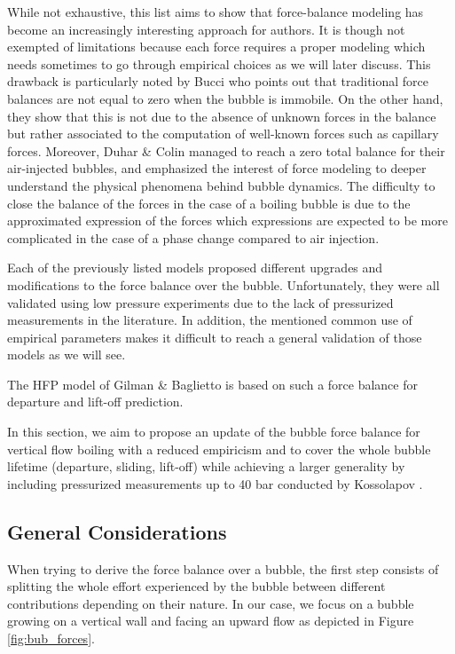 While not exhaustive, this list aims to show that force-balance modeling has become an increasingly interesting approach for authors. It is though not exempted of limitations because each force requires a proper modeling which needs sometimes to go through empirical choices as we will later discuss. This drawback is particularly noted by Bucci \etal \cite{bucci_not-so-subtle_2021} who points out that traditional force balances are not equal to zero when the bubble is immobile. On the other hand, they show that this is not due to the absence of unknown forces in the balance but rather associated to the computation of well-known forces such as capillary forces. Moreover, Duhar \& Colin \cite{duhar_dynamics_2006} managed to reach a zero total balance for their air-injected bubbles, and emphasized the interest of force modeling to deeper understand the physical phenomena behind bubble dynamics. The difficulty to close the balance of the forces in the case of a boiling bubble is due to the approximated expression of the forces which expressions are expected to be more complicated in the case of a phase change compared to air injection.

\npar
Each of the previously listed models proposed different upgrades and modifications to the force balance over the bubble. Unfortunately, they were all validated using low pressure experiments due to the lack of pressurized measurements in the literature. In addition, the mentioned common use of empirical parameters makes it difficult to reach a general validation of those models as we will see. 

\begin{note*}{}
The HFP model of Gilman \& Baglietto \cite{gilman_self-consistent_2017} is based on such a force balance for departure and lift-off prediction.
\end{note*}

\npar
In this section, we aim to propose an update of the bubble force balance for vertical  flow boiling with a reduced empiricism and to cover the whole bubble lifetime (departure, sliding, lift-off) while achieving a larger generality by including pressurized measurements up to 40 bar conducted by Kossolapov \cite{kossolapov_experimental_2021}.

\subsection{General Considerations}


When trying to derive the force balance over a bubble, the first step consists of splitting the whole effort experienced by the bubble between different contributions depending on their nature. In our case, we focus on a bubble growing on a vertical wall and facing an upward flow as depicted in Figure \ref{fig:bub_forces}. 

